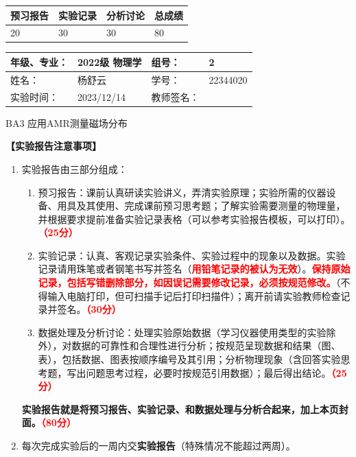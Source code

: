 \documentclass[dvipsnames, svgnames,a4paper,11pt]{article}
\begin{document}
	
	
	
	\begin{table}
		\renewcommand\arraystretch{1.7}
		\begin{tabularx}{\textwidth}{
				|X|X|X|X
				|X|X|X|X|}
			\hline
			\multicolumn{2}{|c|}{预习报告}&\multicolumn{2}{|c|}{实验记录}&\multicolumn{2}{|c|}{分析讨论}&\multicolumn{2}{|c|}{总成绩}\\
			\hline
			\LARGE20 & & \LARGE30 & & \LARGE30 & & \LARGE80 & \\
			\hline
		\end{tabularx}
	\end{table}
	
	\begin{table}
		\renewcommand\arraystretch{1.7}
		\begin{tabularx}{\textwidth}{|X|X|X|X|}
			\hline
			年级、专业： & 2022级 物理学 &组号： & 2\\
			\hline
			姓名： & 杨舒云  & 学号： & 22344020\\
			\hline
			实验时间： & 2023/12/14 & 教师签名： & \\
			\hline
		\end{tabularx}
	\end{table}
	
	\begin{center}
		\LARGE BA3 \quad 应用AMR测量磁场分布
	\end{center}
	
	\textbf{【实验报告注意事项】}
	\begin{enumerate}
		\item 实验报告由三部分组成：
		\begin{enumerate}
			\item 预习报告：课前认真研读实验讲义，弄清实验原理；实验所需的仪器设备、用具及其使用、完成课前预习思考题；了解实验需要测量的物理量，并根据要求提前准备实验记录表格（可以参考实验报告模板，可以打印）。\textcolor{red}{\textbf{（25分）}}
			\item 实验记录：认真、客观记录实验条件、实验过程中的现象以及数据。实验记录请用珠笔或者钢笔书写并签名（\textcolor{red}{\textbf{用铅笔记录的被认为无效}}）。\textcolor{red}{\textbf{保持原始记录，包括写错删除部分，如因误记需要修改记录，必须按规范修改。}}（不得输入电脑打印，但可扫描手记后打印扫描件）；离开前请实验教师检查记录并签名。\textcolor{red}{\textbf{（30分）}}
			\item 数据处理及分析讨论：处理实验原始数据（学习仪器使用类型的实验除外），对数据的可靠性和合理性进行分析；按规范呈现数据和结果（图、表），包括数据、图表按顺序编号及其引用；分析物理现象（含回答实验思考题，写出问题思考过程，必要时按规范引用数据）；最后得出结论。\textcolor{red}{\textbf{（25分）}}
		\end{enumerate}
		\textbf{实验报告就是将预习报告、实验记录、和数据处理与分析合起来，加上本页封面。\textcolor{red}{（80分）}}
		\item 每次完成实验后的一周内交\textbf{实验报告}（特殊情况不能超过两周）。
	\end{enumerate}
	
\end{document}
